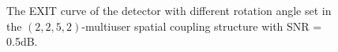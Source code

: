 \documentclass[conference]{IEEEtran}
\begin{document}
\begin{figure}[h!]
\vspace{-1em}
\setlength{\abovecaptionskip}{0.cm}
\setlength{\belowcaptionskip}{-0.cm}
  \caption{The EXIT curve of the detector with different rotation angle set in the $\left( {2,2,5,2} \right)$-multiuser spatial coupling structure with SNR = 0.5dB.}\label{fig.6}
    \vspace{-2em}
\end{figure}
\end{document}
